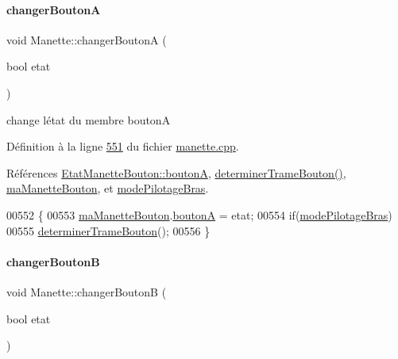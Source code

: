 \paragraph{\texorpdfstring{changer\+BoutonA}{changerBoutonA}}
{\footnotesize\ttfamily void Manette\+::changer\+BoutonA (\begin{DoxyParamCaption}\item[{bool}]{etat }\end{DoxyParamCaption})\hspace{0.3cm}{\ttfamily [slot]}}



change l\textquotesingle{}état du membre boutonA 



Définition à la ligne \hyperlink{manette_8cpp_source_l00551}{551} du fichier \hyperlink{manette_8cpp_source}{manette.\+cpp}.



Références \hyperlink{manette_8h_source_l00124}{Etat\+Manette\+Bouton\+::boutonA}, \hyperlink{manette_8cpp_source_l00393}{determiner\+Trame\+Bouton()}, \hyperlink{manette_8h_source_l00215}{ma\+Manette\+Bouton}, et \hyperlink{manette_8h_source_l00254}{mode\+Pilotage\+Bras}.


\begin{DoxyCode}
00552 \{
00553     \hyperlink{class_manette_ae69fd9baa0dad8a960fa93611b6a185f}{maManetteBouton}.\hyperlink{struct_etat_manette_bouton_a0a1bcb57b5ce1a3f4ff6de5e8749c052}{boutonA} = etat;
00554     \textcolor{keywordflow}{if}(\hyperlink{class_manette_acc2cd9afa45328c0da5c580e5c1a67db}{modePilotageBras})
00555         \hyperlink{class_manette_a3fb9d1245400b6bb6379fbb63a8099ba}{determinerTrameBouton}();
00556 \}
\end{DoxyCode}
\mbox{\label{class_manette_af38f60c4bfa3f76da9c4598b0b144fd6}} 
\paragraph{\texorpdfstring{changer\+BoutonB}{changerBoutonB}}
{\footnotesize\ttfamily void Manette\+::changer\+BoutonB (\begin{DoxyParamCaption}\item[{bool}]{etat }\end{DoxyParamCaption})\hspace{0.3cm}{\ttfamily [slot]}}



